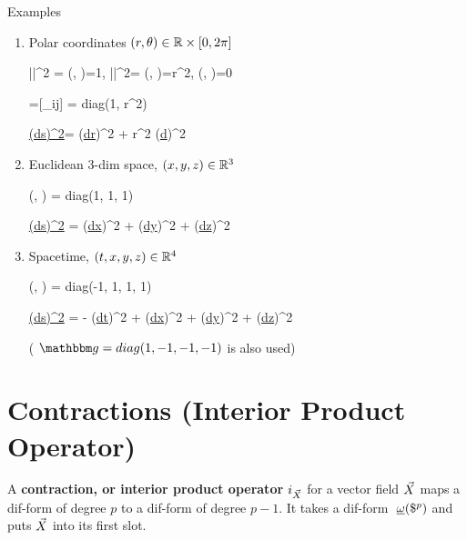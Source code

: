 Examples
\begin{enumerate}
\item Polar coordinates $(r, \theta)
\in { \mathbb{R}}\times [0, 2\pi]$



\beq
||^2 = \metric(, )=1,
\quad
|\vecpder{\theta}|^2=
\metric(\vecpder{\theta}, \vecpder{\theta})=r^2,\quad
\metric(, \vecpder{\theta})=0
\eeq

\beq
\metric=[\metric_{ij}] = diag(1, r^2)
\eeq

\beq
\ul{(ds)^2}= (\ul{dr})^2 + r^2 (\ul{d\theta})^2
\eeq


\item Euclidean 3-dim space, $(x,y,z)\in { \mathbb{R}}^3$

\beq
\metric(, ) = diag(1, 1, 1)
\eeq

\beq
\ul{(ds)^2} =
(\ul{dx})^2
+ (\ul{dy})^2
+ (\ul{dz})^2
\eeq

\item Spacetime,
$(t, x, y, z)\in{ \mathbb{R}}^4$

\beq
\metric(, ) = diag(-1, 1, 1, 1)
\eeq


\beq
\ul{(ds)^2} = - (\ul{dt})^2
+
(\ul{dx})^2
+ (\ul{dy})^2
+ (\ul{dz})^2
\eeq

( $\metric=diag (1,-1,-1,-1)$ is also used)


\end{enumerate}









\section{Contractions (Interior Product Operator)}

A {\bf contraction, or interior product operator}
 $i_{\vec{X}}$
for a vector field ${\vec{X}}$ maps a dif-form of degree $p$ to a
dif-form of degree
$p-1$.
It takes a dif-form $\pform{\omega}{p}$
and puts ${\vec{X}}$ into
its first slot.


